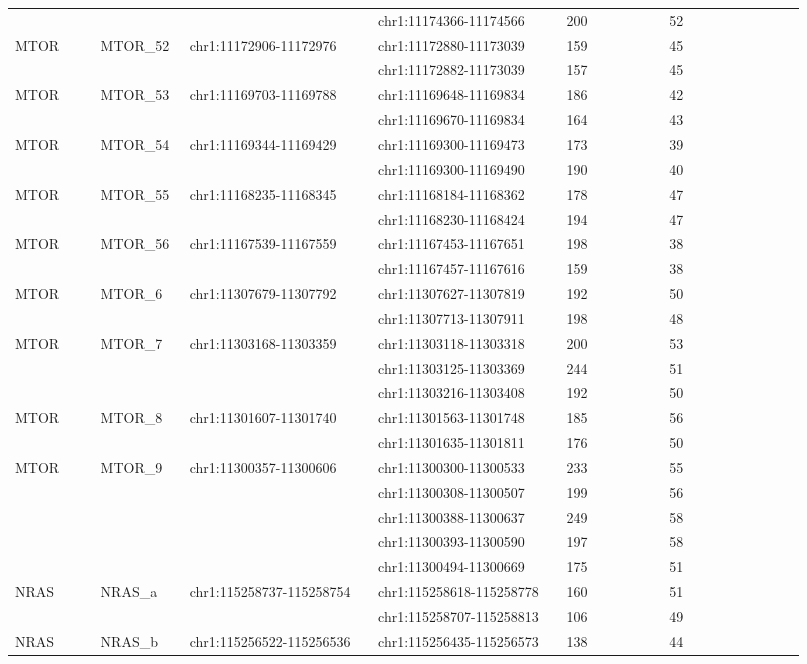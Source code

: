\begin{landscape}
\begin{longtable}{p{0.1\linewidth}|p{0.1\linewidth}p{0.22\linewidth}p{0.22\linewidth}p{0.12\linewidth}p{0.16\linewidth}}
\\
 & & & chr1:11174366-11174566 & 200 & 52
\\
MTOR & MTOR\_52 & chr1:11172906-11172976 & chr1:11172880-11173039 & 159 & 45
\\
 & & & chr1:11172882-11173039 & 157 & 45
\\
MTOR & MTOR\_53 & chr1:11169703-11169788 & chr1:11169648-11169834 & 186 & 42
\\
 & & & chr1:11169670-11169834 & 164 & 43
\\
MTOR & MTOR\_54 & chr1:11169344-11169429 & chr1:11169300-11169473 & 173 & 39
\\
 & & & chr1:11169300-11169490 & 190 & 40
\\
MTOR & MTOR\_55 & chr1:11168235-11168345 & chr1:11168184-11168362 & 178 & 47
\\
 & & & chr1:11168230-11168424 & 194 & 47
\\
MTOR & MTOR\_56 & chr1:11167539-11167559 & chr1:11167453-11167651 & 198 & 38
\\
 & & & chr1:11167457-11167616 & 159 & 38
\\
MTOR & MTOR\_6 & chr1:11307679-11307792 & chr1:11307627-11307819 & 192 & 50
\\
 & & & chr1:11307713-11307911 & 198 & 48
\\
MTOR & MTOR\_7 & chr1:11303168-11303359 & chr1:11303118-11303318 & 200 & 53
\\
 & & & chr1:11303125-11303369 & 244 & 51
\\
 & & & chr1:11303216-11303408 & 192 & 50
\\
MTOR & MTOR\_8 & chr1:11301607-11301740 & chr1:11301563-11301748 & 185 & 56
\\
 & & & chr1:11301635-11301811 & 176 & 50
\\
MTOR & MTOR\_9 & chr1:11300357-11300606 & chr1:11300300-11300533 & 233 & 55
\\
 & & & chr1:11300308-11300507 & 199 & 56
\\
 & & & chr1:11300388-11300637 & 249 & 58
\\
 & & & chr1:11300393-11300590 & 197 & 58
\\
 & & & chr1:11300494-11300669 & 175 & 51
\\
\hline
NRAS & NRAS\_a & chr1:115258737-115258754 & chr1:115258618-115258778 & 160 & 51
\\
 & & & chr1:115258707-115258813 & 106 & 49
\\
NRAS & NRAS\_b & chr1:115256522-115256536 & chr1:115256435-115256573 & 138 & 44
\\

\end{longtable}
\end{landscape}
